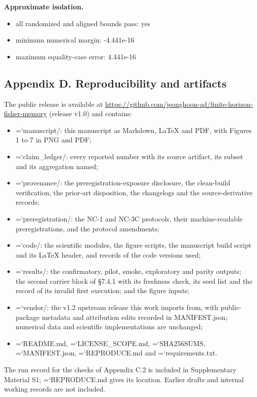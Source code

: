 \documentclass[
  10pt,
]{article}
\providecommand{\tightlist}{%
  \setlength{\itemsep}{0pt}\setlength{\parskip}{0pt}}
\renewcommand{\texttt}[1]{\begingroup\ttfamily\hyphenchar\font=`\-\relax\spaceskip=0pt\hskip0pt\allowbreak#1\endgroup}
\begin{document}
\textbf{Approximate isolation.}

\begin{itemize}
\tightlist
\item
  all randomized and aligned bounds pass: yes
\item
  minimum numerical margin: -4.441e-16
\item
  maximum equality-case error: 4.441e-16
\end{itemize}

\subsection{Appendix D. Reproducibility and
artifacts}\label{appendix-d.-reproducibility-and-artifacts}

The public release is available at
\url{https://github.com/jeonghoon-ad/finite-horizon-fisher-memory}
(release v1.0) and contains:

\begin{itemize}
\tightlist
\item
  \texttt{manuscript/}: this manuscript as Markdown, LaTeX and PDF, with
  Figures 1 to 7 in PNG and PDF;
\item
  \texttt{claim\_ledger/}: every reported number with its source
  artifact, its subset and its aggregation named;
\item
  \texttt{provenance/}: the preregistration-exposure disclosure, the
  clean-build verification, the prior-art disposition, the changelogs
  and the source-derivative records;
\item
  \texttt{preregistration/}: the NC-1 and NC-3C protocols, their
  machine-readable preregistrations, and the protocol amendments;
\item
  \texttt{code/}: the scientific modules, the figure scripts, the
  manuscript build script and its LaTeX header, and records of the code
  versions used;
\item
  \texttt{results/}: the confirmatory, pilot, smoke, exploratory and
  parity outputs; the second carrier block of §7.4.1 with its freshness
  check, its seed list and the record of its invalid first execution;
  and the figure inputs;
\item
  \texttt{vendor/}: the v1.2 upstream release this work imports from,
  with public-package metadata and attribution edits recorded in
  MANIFEST.json; numerical data and scientific implementations are
  unchanged;
\item
  \texttt{README.md}, \texttt{LICENSE\_SCOPE.md}, \texttt{SHA256SUMS},
  \texttt{MANIFEST.json}, \texttt{REPRODUCE.md} and
  \texttt{requirements.txt}.
\end{itemize}

The run record for the checks of Appendix C.2 is included in
Supplementary Material S1; \texttt{REPRODUCE.md} gives its location.
Earlier drafts and internal working records are not included.
\end{document}
